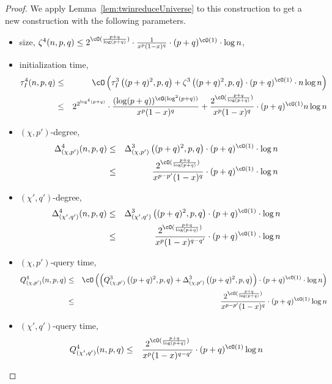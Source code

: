 \begin{proof}
We apply Lemma~\ref{lem:twinreduceUniverse} to this construction to get a new construction with the following parameters.
\begin{itemize} \item  size, 
$\zeta^4(n,p,q) \leq 2^{\cO(\frac{p+q}{\log(p+q)})}\cdot \frac{1}{x^{p}(1-x)^{q}} \cdot  (p+q)^{\cO(1)} \cdot \log n$,
 \item  initialization time, 
\begin{eqnarray*}
\tau_I^4(n,p,q) &\leq& \cO\left(\tau_I^3\left((p+q)^2,p,q\right) + \zeta^3\left((p+q)^2,p,q\right) \cdot (p+q)^{\cO(1)} \cdot n \log n\right)\\
&\leq& 2^{2^{\log^4(p+q)}}\cdot\frac{(\log(p+q))^{\cO(\log^2(p+q))}}{x^p(1-x)^q} + \frac{2^{\cO(\frac{p+q}{\log (p+q)})}}{x^p(1-x)^q} \cdot (p+q)^{\cO(1)}n\log n\\
\end{eqnarray*}
\item $(\chi,p')$-degree, 
\begin{eqnarray*}
\Delta_{(\chi,p')}^4(n,p,q) &\leq& \Delta_{(\chi,p')}^3\left((p+q)^2,p,q\right) \cdot  (p+q)^{\cO(1)} \cdot \log n \\
&\leq& \frac{2^{\cO(\frac{p+q}{\log (p+q)})}}{x^{p-p'}(1-x)^q} \cdot  (p+q)^{\cO(1)} \cdot \log n
\end{eqnarray*}
\item $(\chi',q')$-degree, 
\begin{eqnarray*}
\Delta_{(\chi',q')}^4(n,p,q) &\leq& \Delta_{(\chi',q')}^3\left((p+q)^2,p,q\right) \cdot  (p+q)^{\cO(1)} \cdot \log n \\
&\leq& \frac{2^{\cO(\frac{p+q}{\log (p+q)})}}{x^{p}(1-x)^{q-q'}} \cdot  (p+q)^{\cO(1)} \cdot \log n
\end{eqnarray*}
\item $(\chi,p')$-query time, 
\begin{eqnarray*}
Q_{(\chi,p')}^4(n,p,q) &\leq& \cO\left(\left( Q_{(\chi,p')}^3\left((p+q)^2,p,q\right) + \Delta_{(\chi,p')}^3\left((p+q)^2,p,q\right) \right) \cdot (p+q)^{\cO(1)} \cdot \log n\right)\\
&\leq& \frac{2^{\cO(\frac{p+q}{\log (p+q)})}}{x^{p-p'}(1-x)^q}\cdot (p+q)^{\cO(1)}\log n
\end{eqnarray*}
\item $(\chi',q')$-query time, 
\begin{eqnarray*}
Q_{(\chi',q')}^4(n,p,q) 
&\leq& \frac{2^{\cO(\frac{p+q}{\log (p+q)})}}{x^{p}(1-x)^{q-q'}}\cdot (p+q)^{\cO(1)}\log n 
\end{eqnarray*}

\end{itemize}
\end{proof}
